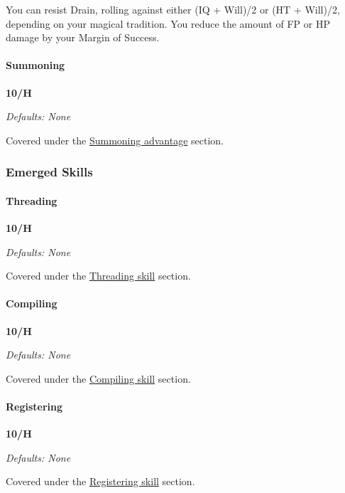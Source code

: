 \begin{multicols*}{3}
	You can resist Drain, rolling against either (IQ + Will)/2 or (HT + Will)/2, depending on your magical tradition. You reduce the amount of FP or HP damage by your Margin of Success.
	
	\paragraph{Summoning}
	\begin{flushright}
		\textbf{10/H}
	\end{flushright}
	\textcolor{NavyBlue}{\textit{Defaults: None}}
	
	Covered under the \hyperref[summoning]{Summoning advantage} section.
	
	\subsubsection*{Emerged Skills}
	
	\paragraph{Threading}
	\begin{flushright}
		\textbf{10/H}
	\end{flushright}
	\textcolor{NavyBlue}{\textit{Defaults: None}}
	
	Covered under the \hyperref[threading]{Threading skill} section.
	
	\paragraph{Compiling}
	\begin{flushright}
		\textbf{10/H}
	\end{flushright}
	\textcolor{NavyBlue}{\textit{Defaults: None}}
	
	Covered under the \hyperref[compiling]{Compiling skill} section.
	
	\paragraph{Registering}
	\begin{flushright}
		\textbf{10/H}
	\end{flushright}
	\textcolor{NavyBlue}{\textit{Defaults: None}}
	
	Covered under the \hyperref[registering]{Registering skill} section.
	
\end{multicols*}


